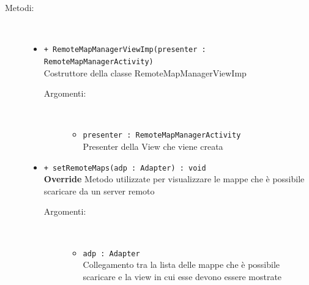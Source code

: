 \documentclass[../DefinizioneDiProdotto.tex]{subfiles}
\begin{document}
\begin{description}
\begin{itemize}
	\end{itemize}
	\item[Metodi:] \
	\begin{itemize}
		\item \texttt{+ RemoteMapManagerViewImp(presenter : RemoteMapManagerActivity)}\\
		Costruttore della classe RemoteMapManagerViewImp
		\begin{description}
			\item[Argomenti:] \
			\begin{itemize}
				\item \texttt{presenter : RemoteMapManagerActivity}\\
				Presenter della View che viene creata\end{itemize}
		\end{description}
		\item \texttt{+ setRemoteMaps(adp : Adapter) : void}\\
		\textbf{Override} Metodo utilizzate per visualizzare le mappe che è possibile scaricare da un server remoto
		\begin{description}
			\item[Argomenti:] \
			\begin{itemize}
				\item \texttt{adp : Adapter}\\
				Collegamento tra la lista delle mappe che è possibile scaricare e la view in cui esse devono essere mostrate\end{itemize}
		\end{description}
	\end{itemize}
\end{description}
\end{document}
